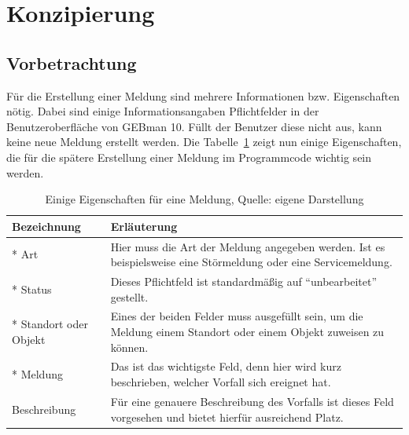 \section{Konzipierung}

\subsection{Vorbetrachtung}
\noindent
Für die Erstellung einer Meldung sind mehrere Informationen bzw. Eigenschaften nötig. Dabei sind einige Informationsangaben Pflichtfelder in der Benutzeroberfläche von GEBman 10. Füllt der Benutzer diese nicht aus, kann keine neue Meldung erstellt werden. Die Tabelle~\ref{tab:Medlungseigenschaften} zeigt nun einige Eigenschaften, die für die spätere Erstellung einer Meldung im Programmcode wichtig sein werden.

\begin{table}[h!]
    \begin{tabular}{ | l | p{11cm}|}
    \hline
    Bezeichnung & Erläuterung \\ \hline
 * Art & Hier muss die Art der Meldung angegeben werden. Ist es beispielsweise eine Störmeldung oder eine Servicemeldung. \\ \hline
 * Status & Dieses Pflichtfeld ist standardmäßig auf \enquote{unbearbeitet} gestellt.  \\ \hline
* Standort oder Objekt & Eines der beiden Felder muss ausgefüllt sein, um die Meldung einem Standort oder einem Objekt zuweisen zu können. \\ \hline
* Meldung & Das ist das wichtigste Feld, denn hier wird kurz beschrieben, welcher Vorfall sich ereignet hat. \\ \hline
Beschreibung & Für eine genauere Beschreibung des Vorfalls ist dieses Feld vorgesehen und bietet hierfür ausreichend Platz. \\ \hline
    \end{tabular}
    \caption[Einige Eigenschaften für eine Meldung]{Einige Eigenschaften für eine Meldung, Quelle: eigene Darstellung}
    \label{tab:Medlungseigenschaften}
\end{table}


